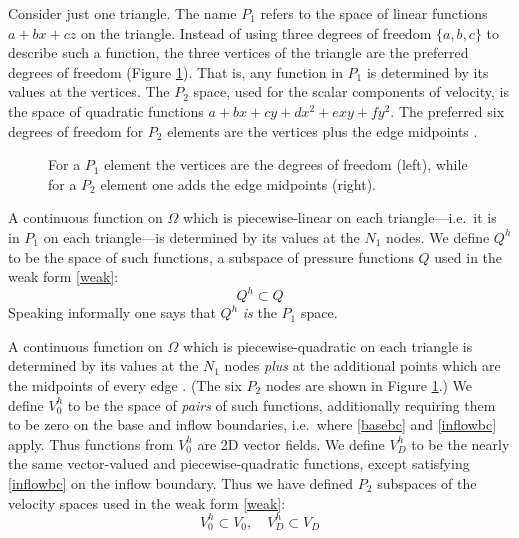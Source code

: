 \documentclass[letterpaper,final,12pt,reqno]{amsart}
\begin{document}
Consider just one triangle.  The name $P_1$ refers to the space of linear functions $a + b x + c z$ on the triangle.  Instead of using three degrees of freedom $\{a,b,c\}$ to describe such a function, the three vertices of the triangle are the preferred degrees of freedom (Figure \ref{fig:fedofs}).  That is, any function in $P_1$ is determined by its values at the vertices.  The $P_2$ space, used for the scalar components of velocity, is the space of quadratic functions $a + bx + cy + dx^2 + exy + fy^2$.  The preferred six degrees of freedom for $P_2$ elements are the vertices plus the edge midpoints \cite{Elmanetal2014}.

\begin{figure}[ht]
\caption{For a $P_1$ element the vertices are the degrees of freedom (left), while for a $P_2$ element one adds the edge midpoints (right).}
\label{fig:fedofs}
\end{figure}

A continuous function on $\Omega$ which is piecewise-linear on each triangle---i.e.~it is in $P_1$ on each triangle---is determined by its values at the $N_1$ nodes.  We define $Q^h$ to be the space of such functions, a subspace of pressure functions $Q$ used in the weak form \eqref{weak}:
    $$Q^h \subset Q$$ 
Speaking informally one says that $Q^h$ \emph{is} the $P_1$ space.

A continuous function on $\Omega$ which is piecewise-quadratic on each triangle is determined by its values at the $N_1$ nodes \emph{plus} at the additional points which are the midpoints of every edge \cite{Elmanetal2014}.  (The six $P_2$ nodes are shown in Figure \ref{fig:fedofs}.)  We define $V_0^h$ to be the space of \emph{pairs} of such functions, additionally requiring them to be zero on the base and inflow boundaries, i.e.~where \eqref{basebc} and \eqref{inflowbc} apply.  Thus functions from $V_0^h$ are 2D vector fields.  We define $V_D^h$ to be the nearly the same vector-valued and piecewise-quadratic functions, except satisfying \eqref{inflowbc} on the inflow boundary.  Thus we have defined $P_2$ subspaces of the velocity spaces used in the weak form \eqref{weak}:
    $$V_0^h \subset V_0, \quad V_D^h \subset V_D$$
\end{document}
